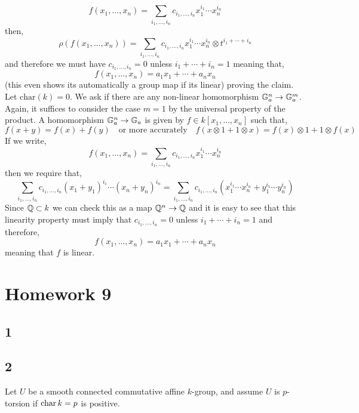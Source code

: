 \documentclass[12pt]{article}
\begin{document}
\[ f(x_1, \dots, x_n) = \sum_{i_1, \dots, i_n} c_{i_1, \dots, i_n} x_1^{i_1} \cdots x_n^{i_n} \]
then,
\[ \rho(f(x_1, \dots, x_n)) = \sum_{i_1, \dots, i_n} c_{i_1, \dots, i_n} x_1^{i_1} \cdots x_n^{i_n} \otimes t^{i_1 + \cdots + i_n} \]
and therefore we must have $c_{i_1, \dots, i_n} = 0$ unless $i_1 + \cdots + i_n = 1$ meaning that,
\[ f(x_1, \dots, x_n) = a_1 x_1 + \cdots + a_n x_n \]
(this even shows its automatically a group map if its linear) proving the claim.
\bigskip\\
Let $\mathrm{char}(k) = 0$. We ask if there are any non-linear homomorphism $\mathbb{G}_a^n \to \mathbb{G}_a^m$. Again, it suffices to consider the case $m = 1$ by the universal property of the product. A homomorphism $\mathbb{G}_a^n \to \mathbb{G}_a$ is given by $f \in k[x_1, \dots, x_n]$ such that,
\[ f(x+y) = f(x) + f(y) \quad \text{or more accurately} \quad f(x \otimes 1 + 1 \otimes x) = f(x) \otimes 1 + 1 \otimes f(x) \]
If we write, 
\[ f(x_1, \dots, x_n) = \sum_{i_1, \dots, i_n} c_{i_1, \dots, i_n} x_1^{i_1} \cdots x_n^{i_n} \]
then we require that,
\[ \sum_{i_1, \dots, i_n} c_{i_1, \dots, i_n} (x_1 + y_1)^{i_1} \cdots (x_n + y_n)^{i_n} = \sum_{i_1, \dots, i_n} c_{i_1, \dots, i_n} (x_1^{i_1} \cdots x_n^{i_n} + y_1^{i_1} \cdots y_n^{i_n}) \]
Since $\mathbb{Q} \subset k$ we can check this as a map $\mathbb{Q}^n \to \mathbb{Q}$ and it is easy to see that this linearity property must imply that $c_{i_1, \dots, i_n} = 0$ unless $i_1 + \cdots + i_n = 1$ and therefore,
\[ f(x_1, \dots, x_n) = a_1 x_1 + \cdots + a_n x_n \]
meaning that $f$ is linear.

\section{Homework 9}

\subsection{1}

\subsection{2}

Let  $U$ be a smooth connected commutative affine $k$-group, and assume $U$ is $p$-torsion if $\operatorname{\mathrm{char}}{k} = p$ is positive.
\end{document}
